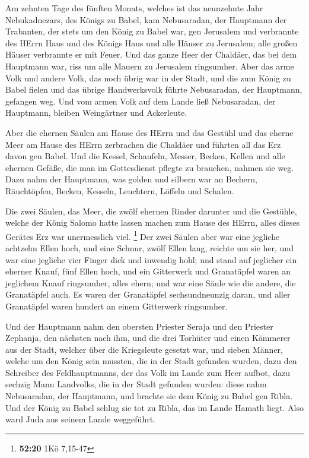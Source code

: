  Am zehnten Tage des fünften Monats, welches ist das
neunzehnte Jahr Nebukadnezars, des Königs zu Babel, kam Nebusaradan, der
Hauptmann der Trabanten, der stets um den König zu Babel war, gen
Jerusalem  und verbrannte des HErrn Haus und des Königs
Haus und alle Häuser zu Jerusalem; alle großen Häuser verbrannte er mit
Feuer.  Und das ganze Heer der Chaldäer, das bei dem
Hauptmann war, riss um alle Mauern zu Jerusalem ringsumher.
 Aber das arme Volk und andere Volk, das noch übrig war in
der Stadt, und die zum König zu Babel fielen und das übrige
Handwerksvolk führte Nebusaradan, der Hauptmann, gefangen weg.
 Und vom armen Volk auf dem Lande ließ Nebusaradan, der
Hauptmann, bleiben Weingärtner und Ackerleute.

 Aber die ehernen Säulen am Hause des HErrn und das Gestühl
und das eherne Meer am Hause des HErrn zerbrachen die Chaldäer und
führten all das Erz davon gen Babel.  Und die Kessel,
Schaufeln, Messer, Becken, Kellen und alle ehernen Gefäße, die man im
Gottesdienst pflegte zu brauchen, nahmen sie weg.  Dazu
nahm der Hauptmann, was golden und silbern war an Bechern, Räuchtöpfen,
Becken, Kesseln, Leuchtern, Löffeln und Schalen.

 Die zwei Säulen, das Meer, die zwölf ehernen Rinder
darunter und die Gestühle, welche der König Salomo hatte lassen machen
zum Hause des HErrn, alles dieses Gerätes Erz war unermesslich viel.
\footnote{\textbf{52:20} 1Kö 7,15-47}  Der zwei Säulen aber
war eine jegliche achtzehn Ellen hoch, und eine Schnur, zwölf Ellen
lang, reichte um sie her, und war eine jegliche vier Finger dick und
inwendig hohl;  und stand auf jeglicher ein eherner Knauf,
fünf Ellen hoch, und ein Gitterwerk und Granatäpfel waren an jeglichem
Knauf ringsumher, alles ehern; und war eine Säule wie die andere, die
Granatäpfel auch.  Es waren der Granatäpfel sechsundneunzig
daran, und aller Granatäpfel waren hundert an einem Gitterwerk
ringsumher.

 Und der Hauptmann nahm den obersten Priester Seraja und
den Priester Zephanja, den nächsten nach ihm, und die drei Torhüter
 und einen Kämmerer aus der Stadt, welcher über die
Kriegsleute gesetzt war, und sieben Männer, welche um den König sein
mussten, die in der Stadt gefunden wurden, dazu den Schreiber des
Feldhauptmanns, der das Volk im Lande zum Heer aufbot, dazu sechzig Mann
Landvolks, die in der Stadt gefunden wurden:  diese nahm
Nebusaradan, der Hauptmann, und brachte sie dem König zu Babel gen
Ribla.  Und der König zu Babel schlug sie tot zu Ribla, das
im Lande Hamath liegt. Also ward Juda aus seinem Lande weggeführt.

